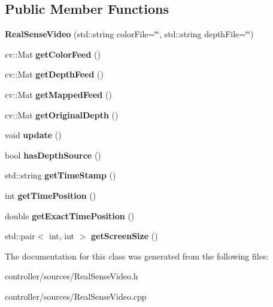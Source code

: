\subsection*{Public Member Functions}
\begin{DoxyCompactItemize}
\item 
\mbox{\label{class_real_sense_video_a76e741fc745150c5d8b1dd7c0964d8ee}} 
{\bfseries Real\+Sense\+Video} (std\+::string color\+File=\char`\"{}\char`\"{}, std\+::string depth\+File=\char`\"{}\char`\"{})
\item 
\mbox{\label{class_real_sense_video_a59df1d401a21f7ec2a353bf5bac922dd}} 
cv\+::\+Mat {\bfseries get\+Color\+Feed} ()
\item 
\mbox{\label{class_real_sense_video_a59f27190cfe07d833752275e2181ca2a}} 
cv\+::\+Mat {\bfseries get\+Depth\+Feed} ()
\item 
\mbox{\label{class_real_sense_video_abb5ab3b64e7996e2af0f60157ca59423}} 
cv\+::\+Mat {\bfseries get\+Mapped\+Feed} ()
\item 
\mbox{\label{class_real_sense_video_af308dfa5dfaaca687c202d2c566739df}} 
cv\+::\+Mat {\bfseries get\+Original\+Depth} ()
\item 
\mbox{\label{class_real_sense_video_a18936f35d354d3fa5702b016018682d9}} 
void {\bfseries update} ()
\item 
\mbox{\label{class_real_sense_video_a82c9c5a3bc99df19cd0d26031f67d235}} 
bool {\bfseries has\+Depth\+Source} ()
\item 
\mbox{\label{class_real_sense_video_a116ba72253f5c99ea97b03b08d0d5152}} 
std\+::string {\bfseries get\+Time\+Stamp} ()
\item 
\mbox{\label{class_real_sense_video_a132141fd5d9fc85881606e29292dd141}} 
int {\bfseries get\+Time\+Position} ()
\item 
\mbox{\label{class_real_sense_video_add6fb9e7b923a848672767c2a6bef56b}} 
double {\bfseries get\+Exact\+Time\+Position} ()
\item 
\mbox{\label{class_real_sense_video_a3ac4729a8746898de82a373badb4ab69}} 
std\+::pair$<$ int, int $>$ {\bfseries get\+Screen\+Size} ()
\end{DoxyCompactItemize}


The documentation for this class was generated from the following files\+:\begin{DoxyCompactItemize}
\item 
controller/sources/Real\+Sense\+Video.\+h\item 
controller/sources/Real\+Sense\+Video.\+cpp\end{DoxyCompactItemize}
